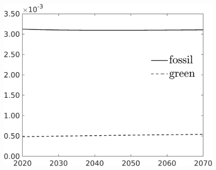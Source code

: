 \begin{figure}[h!!]
\begin{minipage}[]{0.32\textwidth}
		\includegraphics[width=1\textwidth]{../../codding_model/own_basedOnFried/optimalPol_190722_tidiedUp/figures/all_10Aout22/SingleJointTOT_regime3_OPT_NOT_NoTaus_LabourInp_spillover0_noskill0_sep1_xgrowth0_extern0_PV1_etaa0.79_lgd1.png}
	\end{minipage}
\end{figure} 



%

